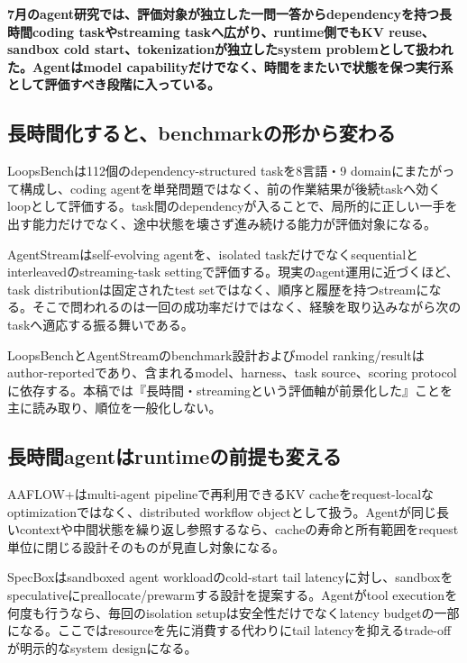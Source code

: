 \noindent\textbf{7月のagent研究では、評価対象が独立した一問一答からdependencyを持つ長時間coding taskやstreaming taskへ広がり、runtime側でもKV reuse、sandbox cold start、tokenizationが独立したsystem problemとして扱われた。Agentはmodel capabilityだけでなく、時間をまたいで状態を保つ実行系として評価すべき段階に入っている。}\autocite{src-30d9d574d4a1,src-4051106eaef3,src-4141dfcd9b12}

\subsection{長時間化すると、benchmarkの形から変わる}

LoopsBenchは112個のdependency-structured taskを8言語・9 domainにまたがって構成し、coding agentを単発問題ではなく、前の作業結果が後続taskへ効くloopとして評価する。task間のdependencyが入ることで、局所的に正しい一手を出す能力だけでなく、途中状態を壊さず進み続ける能力が評価対象になる。\autocite{src-4141dfcd9b12}


AgentStreamはself-evolving agentを、isolated taskだけでなくsequentialとinterleavedのstreaming-task settingで評価する。現実のagent運用に近づくほど、task distributionは固定されたtest setではなく、順序と履歴を持つstreamになる。そこで問われるのは一回の成功率だけではなく、経験を取り込みながら次のtaskへ適応する振る舞いである。\autocite{src-30d9d574d4a1}


\begin{claimboundary}
LoopsBenchとAgentStreamのbenchmark設計およびmodel ranking/resultはauthor-reportedであり、含まれるmodel、harness、task source、scoring protocolに依存する。本稿では『長時間・streamingという評価軸が前景化した』ことを主に読み取り、順位を一般化しない。\autocite{src-30d9d574d4a1,src-4141dfcd9b12}
\end{claimboundary}

\subsection{長時間agentはruntimeの前提も変える}

AAFLOW+はmulti-agent pipelineで再利用できるKV cacheをrequest-localなoptimizationではなく、distributed workflow objectとして扱う。Agentが同じ長いcontextや中間状態を繰り返し参照するなら、cacheの寿命と所有範囲をrequest単位に閉じる設計そのものが見直し対象になる。\autocite{src-4051106eaef3}


SpecBoxはsandboxed agent workloadのcold-start tail latencyに対し、sandboxをspeculativeにpreallocate/prewarmする設計を提案する。Agentがtool executionを何度も行うなら、毎回のisolation setupは安全性だけでなくlatency budgetの一部になる。ここではresourceを先に消費する代わりにtail latencyを抑えるtrade-offが明示的なsystem designになる。\autocite{src-2266222d4bb7}


